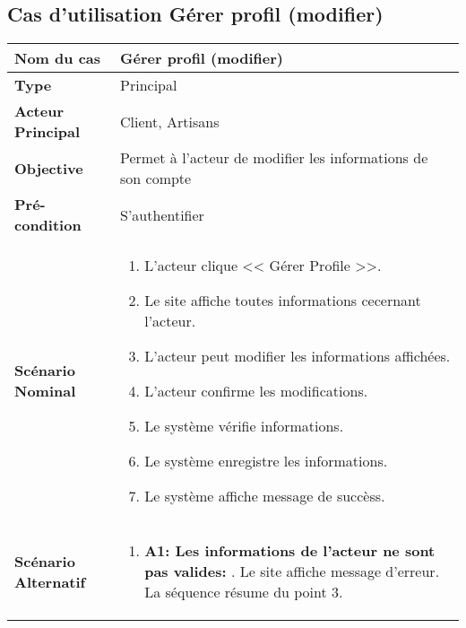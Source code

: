 \subsection{Cas d'utilisation Gérer profil (modifier)}
\renewcommand{\arraystretch}{2}
\begin{center}
	\begin{table}[H]
		\centering
		\tiny{\begin{tabular}{ | l | m{0.51\textheight} |}
			\hline
			\rowcolor[HTML]{06a8ed}
									 \textbf{Nom du cas} & Gérer profil (modifier)\\ 
			\hline \hline
			\cellcolor[HTML]{99ccff} \textbf{Type} & Principal\\
			\hline
			\cellcolor[HTML]{99ccff} \textbf{Acteur Principal} & Client, Artisans\\
			\hline
			\cellcolor[HTML]{99ccff} \textbf{Objective} & Permet à l'acteur de modifier les informations de son compte\\
			\hline
			\cellcolor[HTML]{99ccff} \textbf{Pré-condition} & S'authentifier\\
			\hline
			\cellcolor[HTML]{99ccff} \textbf{Scénario Nominal} & \parbox{0.43\textheight}{
					\begin{enumerate}
						\vspace{0.01\textheight}
						\item L'acteur clique << Gérer Profile >>.
						\item Le site affiche toutes informations cecernant l'acteur.
						\item L'acteur peut modifier les informations affichées.
						\item L'acteur confirme les modifications.
						\item Le système vérifie informations.
						\item Le système enregistre les informations.
						\item Le système affiche message de succèss.
						\vspace{0.01\textheight}
					\end{enumerate}}\\
			\hline
			 \textbf{Scénario Alternatif} & \parbox{0.43\textheight}{
				\begin{enumerate}
					\item \textbf{A1: Les informations de l'acteur ne sont pas valides:}
					. Le site affiche message d'erreur.\newline						
					La séquence résume du point 3.
				\end{enumerate}}\\

\end{tabular}}
\end{table}
\end{center}
